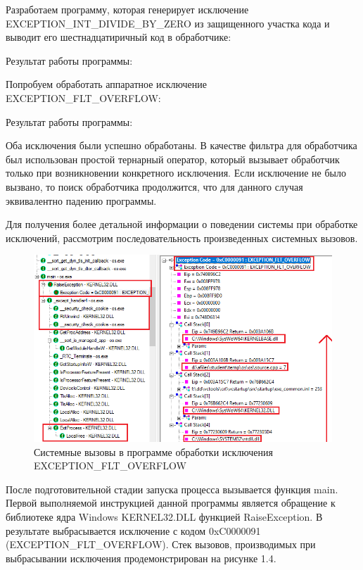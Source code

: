 \documentclass[14pt,a4paper,report]{report}
\begin{document}
Разработаем программу, которая генерирует исключение EXCEPTION\_INT\_DIVIDE\_BY\_ZERO из защищенного участка кода и выводит его шестнадцатиричный код в обработчике:



Результат работы программы:



Попробуем обработать аппаратное исключение EXCEPTION\_FLT\_OVERFLOW:



Результат работы программы:



Оба исключения были успешно обработаны. В качестве фильтра для обработчика был использован простой тернарный оператор, который вызывает обработчик только при возникновении конкретного исключения. Если исключение не было вызвано, то поиск обработчика продолжится, что для данного случая эквивалентно падению программы.

Для получения более детальной информации о поведении системы при обработке исключений, рассмотрим последовательность произведенных системных вызовов. 

\clearpage

\begin{figure}[h!]
	\centering
	\includegraphics[scale = 0.69]{images/1.png}
	\caption{Системные вызовы в программе обработки исключения EXCEPTION\_FLT\_OVERFLOW}
\end{figure}

После подготовительной стадии запуска процесса вызывается функция main. Первой выполняемой инструкцией данной программы является обращение к библиотеке ядра Windows KERNEL32.DLL функцией RaiseException. В результате выбрасывается исключение с кодом 0xC0000091 (EXCEPTION\_FLT\_OVERFLOW). Стек вызовов, производимых при выбрасывании исключения продемонстрирован на рисунке 1.4. 
\end{document}

